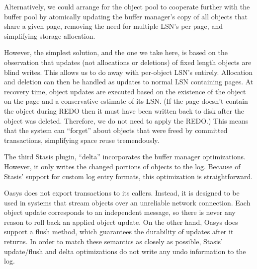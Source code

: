 \documentclass[letterpaper,twocolumn,10pt]{article}
\newcommand{\yad}{Stasis\xspace}
\newcommand{\yads}{Stasis'\xspace}
\newcommand{\oasys}{Oasys\xspace}
\begin{document}
Alternatively, we could arrange for the object pool to cooperate 
further with the buffer pool by atomically updating the buffer 
manager's copy of all objects that share a given page, removing the 
need for multiple LSN's per page, and simplifying storage allocation.

However, the simplest solution, and the one we take here, is based on the observation that
updates (not allocations or deletions) of fixed length objects are blind writes.
This allows us to do away with per-object LSN's entirely.  Allocation and deletion can then be handled
as updates to normal LSN containing pages.  At recovery time, object
updates are executed based on the existence of the object on the page
and a conservative estimate of its LSN.  (If the page doesn't contain
the object during REDO then it must have been written back to disk
after the object was deleted.  Therefore, we do not need to apply the
REDO.)  This means that the system can ``forget'' about objects that 
were freed by committed transactions, simplifying space reuse 
tremendously.

The third \yad plugin, ``delta'' incorporates the buffer
manager optimizations.  However, it only writes the changed portions of
objects to the log.  Because of \yads support for custom log entry
formats, this optimization is straightforward.

%

\oasys does not export transactions to its callers.  Instead, it
is designed to be used in systems that stream objects over an
unreliable network connection.  Each object update corresponds to an
independent message, so there is never any reason to roll back an
applied object update.  On the other hand, \oasys does support a
flush method, which guarantees the durability of updates after it
returns.  In order to match these semantics as closely as possible,
\yads update/flush and delta optimizations do not write any 
undo information to the log.  
\end{document}

